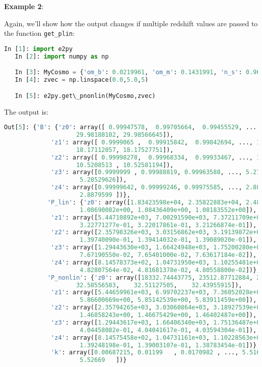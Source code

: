 \documentclass[american,11pt]{article}
\def\code#1{\texttt{#1}}
\begin{document}
\textbf{Example 2}:

Again, we'll show how the output changes if multiple redshift values are passed to the function  \code{get\_plin}:
\begin{lstlisting}[language=python]
   In [1]: import e2py
   In [2]: import numpy as np

   In [3]: MyCosmo = {'om_b': 0.0219961, 'om_m': 0.1431991, 'n_s': 0.96, 'h': 0.67, 'w_0': -1.0, 'sigma_8': 0.83}
   In [4]: zvec = np.linspace(0.0,5.0,5)

   In [5]: e2py.get\_pnonlin(MyCosmo,zvec)
\end{lstlisting}
The output is:
\begin{lstlisting}[language=python]
   Out[5]: {'B': {'z0': array([ 0.99947578,  0.99705664,  0.99455529, ..., 29.980257  ,
                    29.98188102, 29.98566645]),
             'z1': array([ 0.9999065 ,  0.99915842,  0.99842694, ..., 18.17388075,
                    18.17112057, 18.17527751]),
             'z2': array([ 0.99998278,  0.99968334,  0.99933467, ..., 10.50938516,
                    10.5208513 , 10.52581194]),
             'z3': array([0.9999999 , 0.99988819, 0.99963588, ..., 5.27193775, 5.2788227 ,
                     5.28529626]),
             'z4': array([0.99999642, 0.99999246, 0.99975585, ..., 2.88413457, 2.88578951,
                     2.8879599 ])},
            'P_lin': {'z0': array([1.83423598e+04, 2.35822883e+04, 2.48255618e+04, ...,
                     1.08690082e+00, 1.08436409e+00, 1.08183552e+00]),
             'z1': array([5.44710892e+03, 7.00291590e+03, 7.37211709e+03, ...,
                     3.22771277e-01, 3.22017861e-01, 3.21266874e-01]),
             'z2': array([2.35798326e+03, 3.03156862e+03, 3.19139872e+03, ...,
                     1.39740090e-01, 1.39414032e-01, 1.39089020e-01]),
             'z3': array([1.29443630e+03, 1.66424948e+03, 1.75200280e+03, ...,
                     7.67190550e-02, 7.65401000e-02, 7.63617184e-02]),
             'z4': array([8.14578373e+02, 1.04731950e+03, 1.10255481e+03, ...,
                     4.82807564e-02, 4.81681378e-02, 4.80558800e-02])},
            'P_nonlin': {'z0': array([18332.74443775, 23512.87712884, 24690.39381023, ...,
                    32.58556583,    32.51127505,    32.43955915]),
             'z1': array([5.44659961e+03, 6.99702237e+03, 7.36052028e+03, ...,
                     5.86600669e+00, 5.85142539e+00, 5.83911459e+00]),
             'z2': array([2.35794265e+03, 3.03060864e+03, 3.18927539e+03, ...,
                     1.46858243e+00, 1.46675429e+00, 1.46402487e+00]), 
             'z3': array([1.29443617e+03, 1.66406340e+03, 1.75136487e+03, ...,
                     4.04458082e-01, 4.04041617e-01, 4.03594304e-01]),
             'z4': array([8.14575458e+02, 1.04731161e+03, 1.10228563e+03, ...,
                     1.39248198e-01, 1.39003107e-01, 1.38783454e-01])},
             'k': array([0.00687215, 0.01199   , 0.0170982 , ..., 5.51663   , 5.52166   ,
                     5.52669   ])}
\end{lstlisting}
\end{document}
